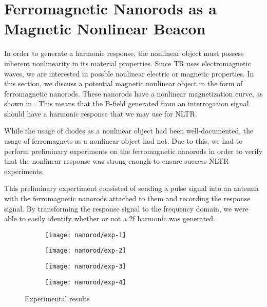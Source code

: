 \chapter{Ferromagnetic Nanorods as a Magnetic Nonlinear Beacon}

\label{ch:nanorod}

In order to generate a harmonic response, the nonlinear object must possess inherent nonlinearity in its material properties. Since TR uses electromagnetic waves, we are interested in possble nonlinear electric or magnetic properties. In this section, we discuss a potential magnetic nonlinear object in the form of ferromagnetic nanorods. These nanorods have a nonlinear magnetization curve, as shown in . This means that the B-field generated from an interrogation signal should have a harmonic response that we may use for NLTR. 

While the usage of diodes as a nonlinear object had been well-documented, the usage of ferromagnets as a nonlinear object had not. Due to this, we had to perform preliminary experiments on the ferromagnetic nanorods in order to verify that the nonlinear response was strong enough to ensure success NLTR experiments. 

This preliminary expertiment consisted of sending a pulse signal into an antenna with the ferromagnetic nanorods attached to them and recording the response signal. By transforming the response signal to the frequency domain, we were able to easily identify whether or not a 2f harmonic was generated. 

\begin{figure}[h!]
    \centering
    \begin{subfigure}{0.45\textwidth}
        \centering
        \texttt{[image: nanorod/exp-1]}
        \caption[]{}
        \label{fig:nanorod-exp-1}
    \end{subfigure}
        \begin{subfigure}{0.45\textwidth}
        \centering
        \texttt{[image: nanorod/exp-2]}
        \caption[]{}
        \label{fig:nanorod-exp-2}
    \end{subfigure}
        \begin{subfigure}{0.45\textwidth}
        \centering
        \texttt{[image: nanorod/exp-3]}
        \caption[]{}
        \label{fig:nanorod-exp-3}
    \end{subfigure}
        \begin{subfigure}{0.45\textwidth}
        \centering
        \texttt{[image: nanorod/exp-4]}
        \caption[]{}
        \label{fig:nanorod-exp-4}
    \end{subfigure}
    \caption[Ferromagnetic nanorod experimental results]{Experimental results}
    \label{fig:nanorod-results}
\end{figure}

